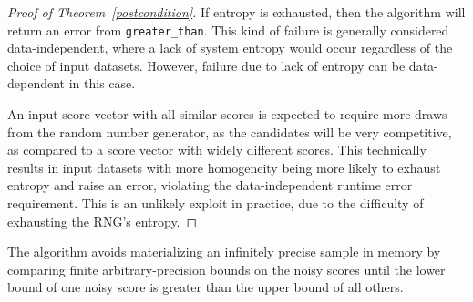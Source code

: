 \documentclass{article}
\begin{document}
\begin{proof}[Proof of Theorem~\ref{postcondition}]
    If entropy is exhausted, then the algorithm will return an error from \texttt{greater\_than}.
    This kind of failure is generally considered data-independent, where a lack of system entropy would occur regardless of the choice of input datasets.
    However, failure due to lack of entropy can be data-dependent in this case.

    An input score vector with all similar scores 
    is expected to require more draws from the random number generator,
    as the candidates will be very competitive, 
    as compared to a score vector with widely different scores. 
    This technically results in input datasets with more homogeneity being more likely to exhaust entropy and raise an error,
    violating the data-independent runtime error requirement.
    This is an unlikely exploit in practice, due to the difficulty of exhausting the RNG's entropy.
\end{proof}

The algorithm avoids materializing an infinitely precise sample in memory by comparing finite arbitrary-precision bounds 
on the noisy scores until the lower bound of one noisy score is greater than the upper bound of all others.
\end{document}
